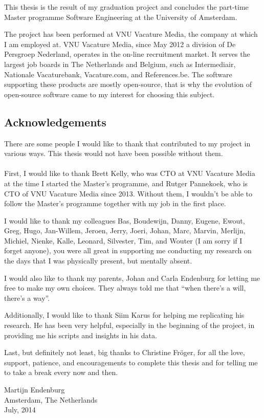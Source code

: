 This thesis is the result of my graduation project and concludes the part-time
Master programme Software Engineering at the University of Amsterdam.

The project has been performed at VNU Vacature Media, the company at which I am
employed at. VNU Vacature Media, since May 2012 a division of De Persgroep
Nederland, operates in the on-line recruitment market. It serves the largest
job boards in The Netherlands and Belgium, such as Intermediair, Nationale
Vacaturebank, Vacature.com, and References.be. The software supporting these
products are mostly open-source, that is why the evolution of open-source
software came to my interest for choosing this subject.

\subsection*{Acknowledgements}
There are some people I would like to thank that contributed to my project
in various ways. This thesis would not have been possible without them.

\paragraph{}
First, I would like to thank Brett Kelly, who was CTO at VNU Vacature Media at
the time I started the Master's programme, and Rutger Pannekoek, who is CTO of
VNU Vacature Media since 2013. Without them, I wouldn't be able to follow the
Master's programme together with my job in the first place.

I would like to thank my colleagues
Bas,
Boudewijn,
Danny,
Eugene,
Ewout,
Greg,
Hugo,
Jan-Willem,
Jeroen,
Jerry,
Joeri,
Johan,
Marc,
Marvin,
Merlijn,
Michiel,
Nienke,
Kalle,
Leonard,
Silvester,
Tim,
and Wouter
(I am sorry if I forget anyone), you were all great in supporting me
conducting my research on the days that I was physically present, but mentally
absent.

I would also like to thank my parents, Johan and Carla Endenburg for letting me
free to make my own choices. They always told me that ``when there's a will,
there's a way''.

Additionally, I would like to thank Siim Karus for helping me replicating his
research. He has been very helpful, especially in the beginning of the project,
in providing me his scripts and insights in his data.

Last, but definitely not least, big thanks to Christine Fr\"{o}ger, for all the
love, support, patience, and encouragements to complete this thesis and for
telling me to take a break every now and then.\\[2em]

\begin{flushright}
Martijn Endenburg\\
Amsterdam, The Netherlands\\
July, 2014
\end{flushright}
